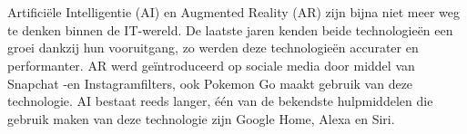 
%
%

%



\chapter*{}

Artificiële Intelligentie (AI) en Augmented Reality (AR) zijn bijna niet meer weg te denken binnen de IT-wereld. De laatste jaren kenden beide technologieën een groei dankzij hun vooruitgang, zo werden deze technologieën accurater en performanter. AR werd geïntroduceerd op sociale media door middel van Snapchat -en Instagramfilters, ook Pokemon Go maakt gebruik van deze technologie. AI bestaat reeds langer, één van de bekendste hulpmiddelen die gebruik maken van deze technologie zijn Google Home, Alexa en Siri. 

